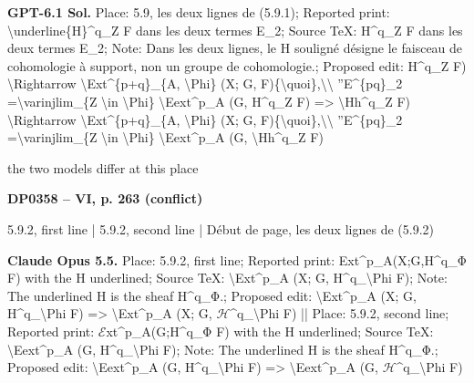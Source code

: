 \textbf{GPT-6.1 Sol.} Place: 5.9, les deux lignes de (5.9.1); Reported print: \textbackslash{}underline\{H\}\textasciicircum{}q\_Z F dans les deux termes E\_2; Source TeX: H\textasciicircum{}q\_Z F dans les deux termes E\_2; Note: Dans les deux lignes, le H souligné désigne le faisceau de cohomologie à support, non un groupe de cohomologie.; Proposed edit: H\textasciicircum{}q\_Z F) \textbackslash{}Rightarrow \textbackslash{}Ext\textasciicircum{}\{p+q\}\_\{A, \textbackslash{}Phi\} (X; G, F)\{\textbackslash{}quoi\},\textbackslash{}\textbackslash{} ''E\textasciicircum{}\{pq\}\_2 =\allowbreak  \textbackslash{}varinjlim\_\{Z \textbackslash{}in \textbackslash{}Phi\} \textbackslash{}Eext\textasciicircum{}p\_A (G, H\textasciicircum{}q\_Z F) =\allowbreak > \textbackslash{}Hh\textasciicircum{}q\_Z F) \textbackslash{}Rightarrow \textbackslash{}Ext\textasciicircum{}\{p+q\}\_\{A, \textbackslash{}Phi\} (X; G, F)\{\textbackslash{}quoi\},\textbackslash{}\textbackslash{} ''E\textasciicircum{}\{pq\}\_2 =\allowbreak  \textbackslash{}varinjlim\_\{Z \textbackslash{}in \textbackslash{}Phi\} \textbackslash{}Eext\textasciicircum{}p\_A (G, \textbackslash{}Hh\textasciicircum{}q\_Z F)\par
the two models differ at this place\par
\par\noindent\hypertarget{DP0358}{}\textbf{DP0358 -- VI, p. 263 (conflict)}\par
5.9.2, first line | 5.9.2, second line | Début de page, les deux lignes de (5.9.2)\par
\textbf{Claude Opus 5.5.} Place: 5.9.2, first line; Reported print: Ext\textasciicircum{}p\_A(X;G,H\textasciicircum{}q\_Φ F) with the H underlined; Source TeX: \textbackslash{}Ext\textasciicircum{}p\_A (X; G, H\textasciicircum{}q\_\textbackslash{}Phi F); Note: The underlined H is the sheaf H\textasciicircum{}q\_Φ.; Proposed edit: \textbackslash{}Ext\textasciicircum{}p\_A (X; G, H\textasciicircum{}q\_\textbackslash{}Phi F) =\allowbreak > \textbackslash{}Ext\textasciicircum{}p\_A (X; G, \ensuremath{\mathcal{H}}\textasciicircum{}q\_\textbackslash{}Phi F) || Place: 5.9.2, second line; Reported print: \ensuremath{\mathcal{E}}xt\textasciicircum{}p\_A(G;H\textasciicircum{}q\_Φ F) with the H underlined; Source TeX: \textbackslash{}Eext\textasciicircum{}p\_A (G, H\textasciicircum{}q\_\textbackslash{}Phi F); Note: The underlined H is the sheaf H\textasciicircum{}q\_Φ.; Proposed edit: \textbackslash{}Eext\textasciicircum{}p\_A (G, H\textasciicircum{}q\_\textbackslash{}Phi F) =\allowbreak > \textbackslash{}Eext\textasciicircum{}p\_A (G, \ensuremath{\mathcal{H}}\textasciicircum{}q\_\textbackslash{}Phi F)\par
